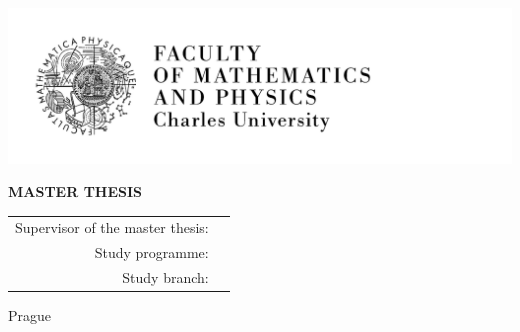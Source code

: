 
\pagestyle{empty}
\hypersetup{pageanchor=false}
\begin{center}

\centerline{\mbox{\includegraphics[width=166mm]{img/logo.pdf}}}

\vspace{-8mm}
\vfill

{\bf\Large MASTER THESIS}

\vfill

{\LARGE\ThesisAuthor}

\vspace{15mm}

{\LARGE\bfseries\ThesisTitle}

\vfill

\Department

\vfill

\begin{tabular}{rl}
	
	Supervisor of the master thesis: & \Supervisor \\
	\noalign{\vspace{2mm}}
	Study programme: & \StudyProgramme \\
	\noalign{\vspace{2mm}}
	Study branch: & \StudyBranch \\
\end{tabular}

\vfill

Prague \YearSubmitted

\end{center}

\newpage

